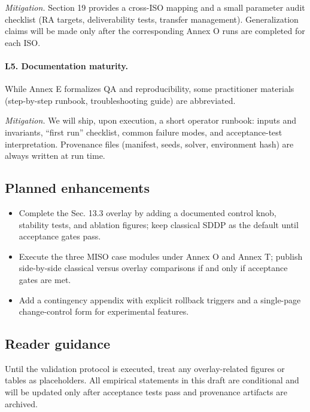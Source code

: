 \documentclass[11pt]{article}
\numberwithin{equation}{section}
\theoremstyle{definition}
\theoremstyle{remark}
\begin{document}
\emph{Mitigation.} Section 19 provides a cross-ISO mapping and a small parameter audit checklist (RA targets, deliverability tests, transfer management). Generalization claims will be made only after the corresponding Annex O runs are completed for each ISO.

\paragraph{L5. Documentation maturity.}
While Annex E formalizes QA and reproducibility, some practitioner materials (step-by-step runbook, troubleshooting guide) are abbreviated.

\emph{Mitigation.} We will ship, upon execution, a short operator runbook: inputs and invariants, “first run” checklist, common failure modes, and acceptance-test interpretation. Provenance files (manifest, seeds, solver, environment hash) are always written at run time.

\subsection*{Planned enhancements}
\begin{itemize}[leftmargin=1.2em]
  \item Complete the Sec. 13.3 overlay by adding a documented control knob, stability tests, and ablation figures; keep classical SDDP as the default until acceptance gates pass.
  \item Execute the three MISO case modules under Annex O and Annex T; publish side-by-side classical versus overlay comparisons if and only if acceptance gates are met.
  \item Add a contingency appendix with explicit rollback triggers and a single-page change-control form for experimental features.
\end{itemize}

\subsection*{Reader guidance}
Until the validation protocol is executed, treat any overlay-related figures or tables as placeholders. All empirical statements in this draft are conditional and will be updated only after acceptance tests pass and provenance artifacts are archived.
\end{document}
